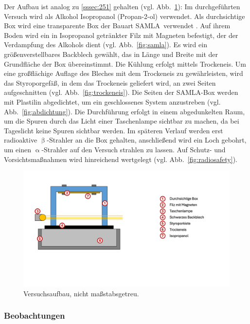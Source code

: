 \documentclass[a4paper,12pt]{article}
\newcommand{\figref}[1]{Abb.~\ref{#1}}
\begin{document}
Der Aufbau ist analog zu \cref{sssec:251} gehalten (vgl. \figref{fig:versuchsaufbau}): Im durchgeführten Versuch wird als Alkohol Isopropanol (Propan-2-ol) verwendet. Als durchsichtige Box wird eine transparente Box der Bauart \glqq SAMLA\grqq \ verwendet \cite{IDGK}. Auf ihrem Boden wird ein in Isopropanol getränkter Filz mit Magneten befestigt, der der Verdampfung des Alkohols dient (vgl. \figref{fig:samla}). Es wird ein größenverstellbares Backblech gewählt, das in Länge und Breite mit der Grundfläche der Box übereinstimmt. Die Kühlung erfolgt mittels Trockeneis. Um eine großflächige Auflage des Bleches mit dem Trockeneis zu gewährleisten, wird das Styroporgefäß, in dem das Trockeneis geliefert wird, an zwei Seiten aufgeschnitten (vgl. \figref{fig:trockeneis}). Die Seiten der SAMLA-Box werden mit Plastilin abgedichtet, um ein geschlossenes System anzustreben (vgl. \figref{fig:abdichtung}). Die Durchführung erfolgt in einem abgedunkelten Raum, um die Spuren durch das Licht einer Taschenlampe sichtbar zu machen, da bei Tageslicht keine Spuren sichtbar werden. Im späteren Verlauf werden erst radioaktive $\upbeta$-Strahler an die Box gehalten, anschließend wird ein Loch gebohrt, um einen $\upalpha$-Strahler auf den Versuch strahlen zu lassen. Auf Schutz- und Vorsichtsmaßnahmen wird hinreichend wertgelegt (vgl. \figref{fig:radiosafety}).
\begin{figure}[t!]
\centering
\includegraphics[width=\textwidth, trim={0 160pt 0 60pt}, clip]{Versuchsaufbau_2}
\caption[Versuchsaufbau, nicht maßstabsgetreu. -- Quelle: Autor. ]{Versuchsaufbau, nicht maßstabsgetreu.}
\label{fig:versuchsaufbau}
\end{figure}



\subsubsection{Beobachtungen} \label{sssec:253}
\end{document}
